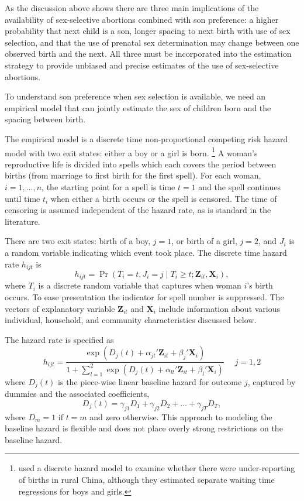 \documentclass[12pt,letterpaper]{article}
\begin{document}
As the discussion above shows there are three main
implications of the availability of sex-selective abortions
combined with son preference:
a higher probability that next child is a son, 
longer spacing to next birth with use of sex selection, 
and that the use of prenatal sex determination may change between 
one observed birth and the next.
All three must be incorporated into the estimation strategy
to provide unbiased and precise estimates of the use of sex-selective abortions.%

To understand son preference when sex selection is available,
we need an empirical model that can jointly estimate the sex of
children born and the spacing between birth. 

The empirical model is a discrete time non-proportional competing risk hazard model with 
two exit states: either a boy or a girl is born.%
\footnote{
\cite{Merli2000} used a discrete hazard model to examine whether 
there were under-reporting of births in rural China, although they 
estimated separate waiting time regressions for boys and girls.
}
A woman's reproductive life is divided into spells which each covers 
the period between births (from marriage to first birth for the first spell).
For each woman, $i=1,\ldots,n$, the starting point for a spell is time $t=1$ and 
the spell continues until time $t_i$ when either a birth occurs or the spell is censored.
The time of censoring is assumed independent of the hazard rate,
as is standard in the literature.

There are two exit states: birth of a boy, $j=1$, or birth of a girl, $j=2$, and 
$J_i$ is a random variable indicating which event took place.
The discrete time hazard rate $h_{ijt}$ is
\begin{equation}
 h_{ijt} = \Pr (T_i=t, J_i=j \mid T_i \geq t; \mathbf{Z}_{it},\mathbf{X}_{i} ),
\end{equation}
where $T_i$ is a discrete random variable that captures when woman $i$'s birth occurs.
To ease presentation the indicator for spell number is suppressed.
The vectors of explanatory variable $\mathbf{Z}_{it}$ and $\mathbf{X}_{i}$ include 
information about various individual, household, and community characteristics 
discussed below.

The hazard rate is specified as
\begin{equation}
 h_{ijt} = \frac{\exp(D_j(t) + \alpha_{jt}'\mathbf{Z}_{it} + \beta_j'\mathbf{X}_{i})} 
 {1 + \sum_{l=1}^2 \exp(D_j(t) + \alpha_{lt}'\mathbf{Z}_{it} + \beta_l'\mathbf{X}_{i})} \: \: \; \; \;  j = 1,2
 \label{eq:hazard}
\end{equation}
where $D_{j}(t)$ is the piece-wise linear baseline hazard for outcome $j$, captured
by dummies and the associated coefficients,
\begin{equation}
D_j(t) = \gamma_{j1} D_1 + \gamma_{j2} D_2 + \ldots + \gamma_{jT} D_T,
\end{equation}
where $D_m = 1$ if $t=m$ and zero otherwise.
This approach to modeling the baseline hazard is flexible and does not place overly strong 
restrictions on the baseline hazard.
\end{document}
